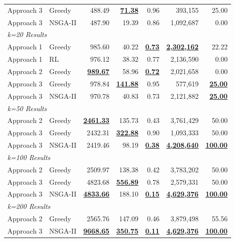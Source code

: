\documentclass{article}
\begin{document}
\begin{table}[htbp]
{\begin{tabular}{@{}llrrrrr@{}}
\quad Approach 3 & Greedy & 488.49 & \textbf{\underline{71.38}} & 0.96 & 393,155 & 25.00 \\
\quad Approach 3 & NSGA-II & 487.90 & 19.39 & 0.86 & 1,092,687 & 0.00 \\
\midrule
\multicolumn{7}{l}{\textit{k=20 Results}} \\
\quad Approach 1 & Greedy & 985.60 & 40.22 & \textbf{\underline{0.73}} & \textbf{\underline{2,302,162}} & 22.22 \\
\quad Approach 1 & RL & 976.12 & 38.32 & 0.77 & 2,136,590 & 0.00 \\
\quad Approach 2 & Greedy & \textbf{\underline{989.67}} & 58.96 & \textbf{\underline{0.72}} & 2,021,658 & 0.00 \\
\quad Approach 3 & Greedy & 978.84 & \textbf{\underline{141.88}} & 0.95 & 577,619 & \textbf{\underline{25.00}} \\
\quad Approach 3 & NSGA-II & 970.78 & 40.83 & 0.73 & 2,121,882 & \textbf{\underline{25.00}} \\
\midrule
\multicolumn{7}{l}{\textit{k=50 Results}} \\
\quad Approach 2 & Greedy & \textbf{\underline{2461.33}} & 135.73 & 0.43 & 3,761,429 & 50.00 \\
\quad Approach 3 & Greedy & 2432.31 & \textbf{\underline{322.88}} & 0.90 & 1,093,333 & 50.00 \\
\quad Approach 3 & NSGA-II & 2419.46 & 98.19 & \textbf{\underline{0.38}} & \textbf{\underline{4,208,640}} & \textbf{\underline{100.00}} \\
\midrule
\multicolumn{7}{l}{\textit{k=100 Results}} \\
\quad Approach 2 & Greedy & 2509.97 & 138.38 & 0.42 & 3,783,202 & 50.00 \\
\quad Approach 3 & Greedy & 4823.68 & \textbf{\underline{556.89}} & 0.78 & 2,579,331 & 50.00 \\
\quad Approach 3 & NSGA-II & \textbf{\underline{4833.66}} & 188.10 & \textbf{\underline{0.15}} & \textbf{\underline{4,629,376}} & \textbf{\underline{100.00}} \\
\midrule
\multicolumn{7}{l}{\textit{k=200 Results}} \\
\quad Approach 2 & Greedy & 2565.76 & 147.09 & 0.46 & 3,879,498 & 55.56 \\
\quad Approach 3 & NSGA-II & \textbf{\underline{9668.65}} & \textbf{\underline{350.75}} & \textbf{\underline{0.11}} & \textbf{\underline{4,629,376}} & \textbf{\underline{100.00}} \\
\bottomrule
\end{tabular}%
}
\vspace{0.1cm}


\end{table}
\end{document}
